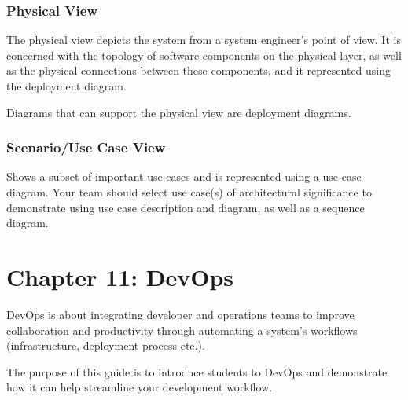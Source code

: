 \documentclass[letterpaper,10pt,english]{jupyterBook}
\begin{document}
\sphinxAtStartPar
{}

\sphinxAtStartPar
{}


\subsection{Physical View}
\label{\detokenize{chapter_10/architecture:physical-view}}
\sphinxAtStartPar
The physical view depicts the system from a system engineer’s point of
view. It is concerned with the topology of software components on the
physical layer, as well as the physical connections between these
components, and it represented using the deployment diagram.

\sphinxAtStartPar
Diagrams that can support the physical view are deployment diagrams.

\sphinxAtStartPar
{}

\sphinxAtStartPar
{}


\subsection{Scenario/Use Case View}
\label{\detokenize{chapter_10/architecture:scenario-use-case-view}}
\sphinxAtStartPar
Shows a subset of important use cases and is represented using a use
case diagram. Your team should select use case(s) of architectural
significance to demonstrate using use case description and diagram, as
well as a sequence diagram.

\sphinxAtStartPar
{}

\sphinxAtStartPar
{}


\chapter{Chapter 11: DevOps}
\label{\detokenize{chapter_11/devops:chapter-11-devops}}\label{\detokenize{chapter_11/devops::doc}}
\sphinxAtStartPar
DevOps is about integrating developer and operations teams to improve
collaboration and productivity through automating
a system’s workflows (infrastructure, deployment process etc.).

\sphinxAtStartPar
The purpose of this guide is to introduce students to DevOps and
demonstrate how it can help streamline your development workflow.
\end{document}
